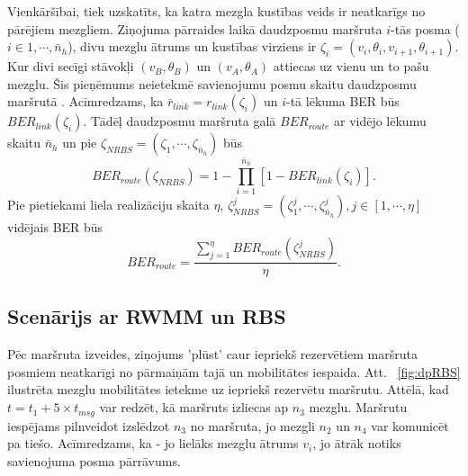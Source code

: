 Vienkāršībai, tiek uzskatīts, ka katra mezgla kustības veids ir neatkarīgs no pārējiem mezgliem. Ziņojuma pārraides laikā daudzposmu maršruta $i$-tās posma ($i \in {1,\cdots ,\bar{n}_{h}}$), divu mezglu ātrums un kustības virziens ir $\zeta_{i}=(v_{i},\theta_{i},v_{i+1}, \theta_{i+1})$. Kur divi secīgi stāvokļi $(v_{B},\theta_{B})$ un $(v_{A}, \theta_{A})$ attiecas uz vienu un to pašu mezglu. Šis pieņēmums neietekmē savienojumu posmu skaitu daudzposmu maršrutā \cite{qoS_mobility}. Acīmredzams, ka $\bar{r}_{link} = r_{link}(\zeta_{i})$ un $i$-tā lēkuma BER būs $BER_{link}(\zeta_{i})$. Tādēļ daudzposmu maršruta galā $BER_{route}$ ar vidējo lēkumu skaitu $\bar{n}_{h}$ un pie $\zeta_{NRBS}=(\zeta_{1}, \cdots,\zeta_{\bar{n}_{h}})$ būs \cite{qoS_mobility}
\begin{equation}
BER_{route}(\zeta_{NRBS})=1-\prod_{i=1}^{\bar{n}_{h}}\left[1-BER_{link}(\zeta_{i})\right].
\end{equation}
Pie pietiekami liela realizāciju skaita $\eta$, $\zeta_{NRBS}^{j}=(\zeta^{j}_{1}, \cdots,\zeta^{j}_{\bar{n}_{h}}), j\in[1, \cdots,\eta]$ vidējais BER būs \cite{qoS_mobility}
\begin{equation}
BER_{route}=\frac{\sum_{j=1}^{\eta}BER_{route}\left(\zeta_{NRBS}^{j}\right)}{\eta}.
\end{equation}


\subsection{Scenārijs ar RWMM un RBS}
Pēc maršruta izveides, ziņojums 'plūst' caur iepriekš rezervētiem maršruta posmiem neatkarīgi no pārmaiņām tajā un mobilitātes iespaida. Att. ~\ref{fig:dpRBS} ilustrēta mezglu mobilitātes ietekme uz iepriekš rezervētu maršrutu. Attēlā, kad $t=t_{1}+5\times t_{msg}$ var redzēt, kā maršruts izliecas ap $n_{3}$ mezglu. Maršrutu iespējams pilnveidot izslēdzot $n_{3}$ no maršruta, jo mezgli $n_{2}$ un $n_{4}$ var komunicēt pa tiešo. Acīmredzams, ka - jo lielāks mezglu ātrums $v_{i}$, jo ātrāk notiks savienojuma posma pārrāvums.

